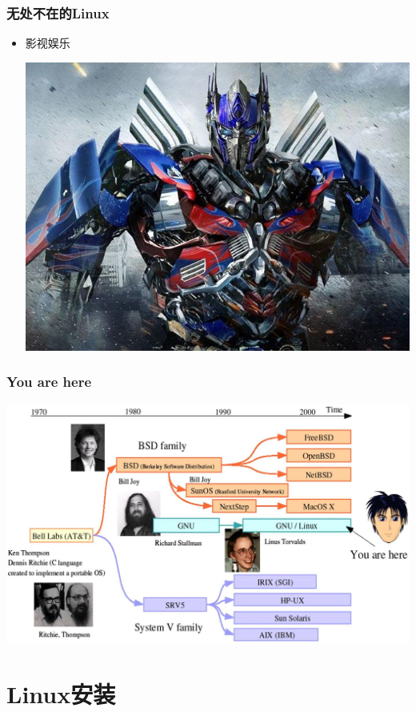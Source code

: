 \documentclass[xcolor=svgnames,bigger,presentation]{beamer}
\begin{document}
\begin{frame}
\frametitle{无处不在的Linux}
\label{sec-2-4-11}
\begin{itemize}

\item 影视娱乐
\label{sec-2-4-11-1}%
\begin{center}
\includegraphics[width=.9\linewidth]{img/jingang.jpg}
\end{center}

\end{itemize} %
\end{frame}
\begin{frame}
\frametitle{You are here}
\label{sec-2-4-12}

\begin{center}
\includegraphics[width=.9\linewidth]{img/here.jpg}
\end{center}
\end{frame}
\section{Linux安装}
\label{sec-3}
\end{document}
